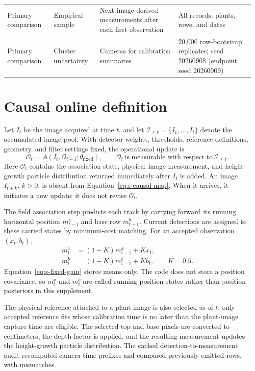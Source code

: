 \documentclass[12pt,letterpaper]{article}
\begin{document}
\begin{longtable}{L{2.45cm}L{4.05cm}L{3.25cm}L{3.25cm}}
Primary comparison & Empirical sample & Next image-derived measurements after each first observation & All \FieldN{} records, \FieldPlants{} plants, \FieldRows{} rows, and \FieldDates{} dates \\
Primary comparison & Cluster uncertainty & Cameras for calibration summaries & 20,000 row-bootstrap replicates; seed 20260908 (endpoint seed 20260909) \\
\end{longtable}

\section{Causal online definition}
\label{sec:s-causal}

Let $I_t$ be the image acquired at time $t$, and let $\mathcal I_{\leq t}=\{I_1,\ldots,I_t\}$ denote the accumulated image pool. With detector weights, thresholds, reference definitions, geometry, and filter settings fixed, the operational update is
\begin{equation}
\mathcal O_t=A\!\left(I_t,\mathcal O_{t-1};\theta_{\mathrm{fixed}}\right),
\qquad
\mathcal O_t\ \text{is measurable with respect to}\ \mathcal I_{\leq t}.
\label{eq:s-causal-map}
\end{equation}
Here $\mathcal O_t$ contains the association state, physical image measurement, and height-growth particle distribution returned immediately after $I_t$ is added. An image $I_{t+k}$, $k>0$, is absent from Equation~\ref{eq:s-causal-map}. When it arrives, it initiates a new update; it does not revise $\mathcal O_t$.

The field association step predicts each track by carrying forward its running horizontal position $m^x_{t-1}$ and base row $m^b_{t-1}$. Current detections are assigned to these carried states by minimum-cost matching. For an accepted observation $(x_t,b_t)$,
\begin{align}
m^x_t &= (1-K)m^x_{t-1}+Kx_t,\\
m^b_t &= (1-K)m^b_{t-1}+Kb_t, \qquad K=0.5.
\label{eq:s-fixed-gain}
\end{align}
Equation~\ref{eq:s-fixed-gain} stores means only. The code does not store a position covariance, so $m^x_t$ and $m^b_t$ are called running position states rather than position posteriors in this supplement.

The physical reference attached to a plant image is also selected as of $t$: only accepted reference fits whose calibration time is no later than the plant-image capture time are eligible. The selected top and base pixels are converted to centimeters, the depth factor is applied, and the resulting measurement updates the height-growth particle distribution. The cached detection-to-measurement audit recomputed \CausalPrefixes{} camera-time prefixes and compared \CausalRows{} previously emitted rows, with \CausalMismatches{} mismatches.
\end{document}
